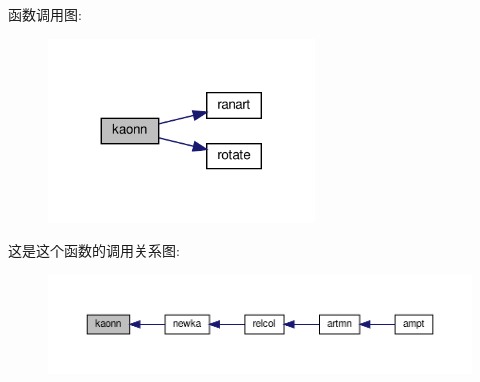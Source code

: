 函数调用图\+:
\nopagebreak
\begin{figure}[H]
\begin{center}
\leavevmode
\includegraphics[width=200pt]{kaonn_8f90_ab2d6fb788f53b5186414211218640cfd_cgraph}
\end{center}
\end{figure}
这是这个函数的调用关系图\+:
\nopagebreak
\begin{figure}[H]
\begin{center}
\leavevmode
\includegraphics[width=350pt]{kaonn_8f90_ab2d6fb788f53b5186414211218640cfd_icgraph}
\end{center}
\end{figure}
